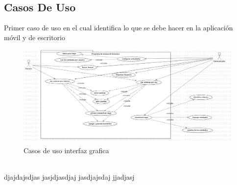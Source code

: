 \subsection{Casos De Uso}
Primer caso de uso en el cual identifica lo que se debe hacer en la aplicación móvil y de escritorio\\
\begin{figure}[h]
  \includegraphics[width=\linewidth]{staruml/img/caso-de-uso-1.png}
  \caption{Casos de uso interfaz grafica}
  \label{fig:Casos de uso para manejo de cliente}
\end{figure}\\

djajdajsdjas jasjdjasdjaj jasdjajsdaj jjadjasj